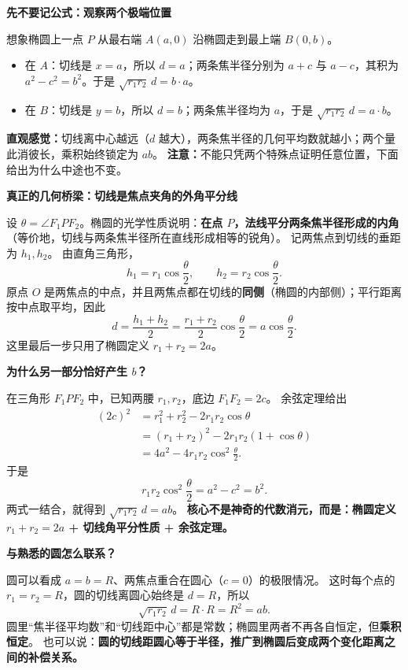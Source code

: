 \begin{explanationbox}
\textbf{\textcolor{CExplanation}{先不要记公式：观察两个极端位置}}

想象椭圆上一点 $P$ 从最右端 $A(a,0)$ 沿椭圆走到最上端 $B(0,b)$。
\begin{itemize}[leftmargin=*,itemsep=0.35em]
  \item 在 $A$：切线是 $x=a$，所以 $d=a$；两条焦半径分别为 $a+c$ 与 $a-c$，其积为 $a^2-c^2=b^2$。于是 $\sqrt{r_1r_2}\,d=b\cdot a$。
  \item 在 $B$：切线是 $y=b$，所以 $d=b$；两条焦半径均为 $a$，于是 $\sqrt{r_1r_2}\,d=a\cdot b$。
\end{itemize}
\textbf{直观感觉：}切线离中心越远（$d$ 越大），两条焦半径的几何平均数就越小；两个量此消彼长，乘积始终锁定为 $ab$。
\textbf{注意：}不能只凭两个特殊点证明任意位置，下面给出为什么中途也不变。

\medskip
\textbf{\textcolor{CExplanation}{真正的几何桥梁：切线是焦点夹角的外角平分线}}

设 $\theta=\angle F_1PF_2$。椭圆的光学性质说明：\textbf{在点 $P$，法线平分两条焦半径形成的内角}（等价地，切线与两条焦半径所在直线形成相等的锐角）。
记两焦点到切线的垂距为 $h_1,h_2$。
由直角三角形，
\[
h_1=r_1\cos\frac{\theta}{2},\qquad
h_2=r_2\cos\frac{\theta}{2}.
\]
原点 $O$ 是两焦点的中点，并且两焦点都在切线的\textbf{同侧}（椭圆的内部侧）；平行距离按中点取平均，因此
\[
d=\frac{h_1+h_2}{2}
 =\frac{r_1+r_2}{2}\cos\frac{\theta}{2}
 =a\cos\frac{\theta}{2}.
\]
这里最后一步只用了椭圆定义 $r_1+r_2=2a$。

\medskip
\textbf{\textcolor{CExplanation}{为什么另一部分恰好产生 $b$？}}

在三角形 $F_1PF_2$ 中，已知两腰 $r_1,r_2$，底边 $F_1F_2=2c$。
余弦定理给出
\[
\begin{aligned}
(2c)^2
 &=r_1^2+r_2^2-2r_1r_2\cos\theta\\
 &=(r_1+r_2)^2-2r_1r_2(1+\cos\theta)\\
 &=4a^2-4r_1r_2\cos^2\frac{\theta}{2}.
\end{aligned}
\]
于是
\[
r_1r_2\cos^2\frac{\theta}{2}=a^2-c^2=b^2.
\]
两式一结合，就得到 $\sqrt{r_1r_2}\,d=ab$。
\textbf{核心不是神奇的代数消元，而是：椭圆定义 $r_1+r_2=2a$ + 切线角平分性质 + 余弦定理。}

\medskip
\textbf{\textcolor{CExplanation}{与熟悉的圆怎么联系？}}

圆可以看成 $a=b=R$、两焦点重合在圆心（$c=0$）的极限情况。
这时每个点的 $r_1=r_2=R$，圆的切线离圆心始终是 $d=R$，所以
\[
\sqrt{r_1r_2}\,d=R\cdot R=R^2=ab.
\]
圆里“焦半径平均数”和“切线距中心”都是常数；椭圆里两者不再各自恒定，但\textbf{乘积恒定}。
也可以说：\textbf{圆的切线距圆心等于半径，推广到椭圆后变成两个变化距离之间的补偿关系。}


\end{explanationbox}

